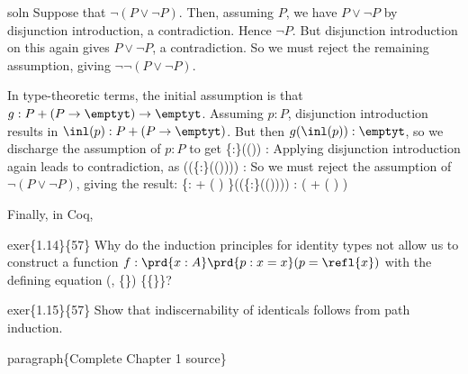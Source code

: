 soln  Suppose that $\lnot(P \lor \lnot P)$.  Then, assuming $P$, we have
$P \lor \lnot P$ by disjunction introduction, a contradiction.  Hence
$\lnot P$.  But disjunction introduction on this again gives $P \lor \lnot P$,
a contradiction.  So we must reject the remaining assumption, giving
$\lnot\lnot(P \lor \lnot P)$.


In type-theoretic terms, the initial assumption is that $g : P + (P \to
\emptyt) \to \emptyt$.  Assuming $p : P$, disjunction introduction results in
$\inl(p) : P + (P \to \emptyt)$.  But then $g(\inl(p)) : \emptyt$, so we
discharge the assumption of $p : P$ to get
  \{:\}(()) :   
Applying disjunction introduction again leads to contradiction, as
  ((\{:\}(()))) : 
So we must reject the assumption of $\lnot( P \lor \lnot P)$, giving the
result:
  \{: + (  )  \}((\{:\}(()))) 
  : 
  ( + (  )  )  


Finally, in Coq,


exer\{1.14\}\{57\}  Why do the induction principles for identity types not allow
us to construct a function $f : \prd{x:A}\prd{p:x=x}(p = \refl{x})$ with the
defining equation
  (, \{\})  \{\{\}\}?


exer\{1.15\}\{57\} Show that indiscernability of identicals follows from path
induction.


paragraph\{Complete Chapter 1 source\}


\begin{coqdoccode}
\end{coqdoccode}
